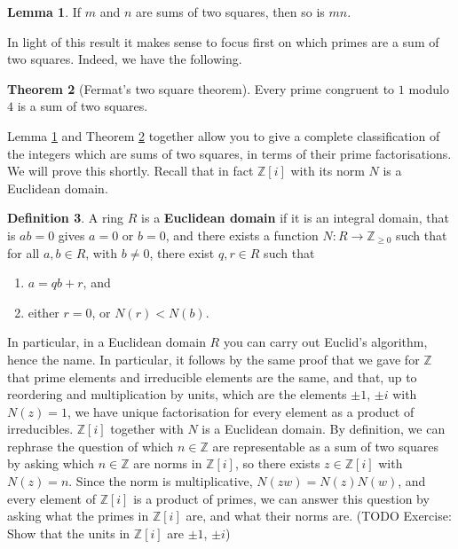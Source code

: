 \documentclass{article}
\newcommand{\Z}{\mathbb{Z}}
\newcommand{\rb}[1]{\left( #1 \right)}
\renewcommand{\sb}[1]{\left[ #1 \right]}
\theoremstyle{definition}\newtheorem{definition}{Definition}
\theoremstyle{definition}\newtheorem{remark}[definition]{Remark}
\theoremstyle{definition}\newtheorem*{example}{Example}
\theoremstyle{definition}\newtheorem*{note}{Note}
\newtheorem{lemma}[definition]{Lemma}
\newtheorem{theorem}[definition]{Theorem}
\begin{document}
\begin{lemma}
\label{lem:46}
If $ m $ and $ n $ are sums of two squares, then so is $ mn $.
\end{lemma}

In light of this result it makes sense to focus first on which primes are a sum of two squares. Indeed, we have the following.

\begin{theorem}[Fermat's two square theorem]
\label{thm:47}
Every prime congruent to $ 1 $ modulo $ 4 $ is a sum of two squares.
\end{theorem}

Lemma \ref{lem:46} and Theorem \ref{thm:47} together allow you to give a complete classification of the integers which are sums of two squares, in terms of their prime factorisations. We will prove this shortly. Recall that in fact $ \Z\sb{i} $ with its norm $ N $ is a Euclidean domain.

\begin{definition}
A ring $ R $ is a \textbf{Euclidean domain} if it is an integral domain, that is $ ab = 0 $ gives $ a = 0 $ or $ b = 0 $, and there exists a function $ N : R \to \Z_{\ge 0} $ such that for all $ a, b \in R $, with $ b \ne 0 $, there exist $ q, r \in R $ such that
\begin{enumerate}
\item $ a = qb + r $, and
\item either $ r = 0 $, or $ N\rb{r} < N\rb{b} $.
\end{enumerate}
\end{definition}

In particular, in a Euclidean domain $ R $ you can carry out Euclid's algorithm, hence the name. In particular, it follows by the same proof that we gave for $ \Z $ that prime elements and irreducible elements are the same, and that, up to reordering and multiplication by units, which are the elements $ \pm 1 $, $ \pm i $ with $ N\rb{z} = 1 $, we have unique factorisation for every element as a product of irreducibles. $ \Z\sb{i} $ together with $ N $ is a Euclidean domain. By definition, we can rephrase the question of which $ n \in \Z $ are representable as a sum of two squares by asking which $ n \in \Z $ are norms in $ \Z\sb{i} $, so there exists $ z \in \Z\sb{i} $ with $ N\rb{z} = n $. Since the norm is multiplicative, $ N\rb{zw} = N\rb{z}N\rb{w} $, and every element of $ \Z\sb{i} $ is a product of primes, we can answer this question by asking what the primes in $ \Z\sb{i} $ are, and what their norms are. (TODO Exercise: Show that the units in $ \Z\sb{i} $ are $ \pm 1 $, $ \pm i $)
\end{document}
